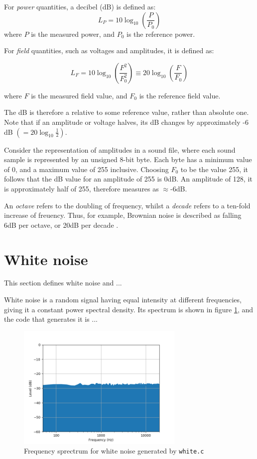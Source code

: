 \documentclass[a4paper,10pt]{article}
\def\code#1{\texttt{#1}}
\begin{document}
For \emph{power} quantities, a decibel (dB) is defined \cite{dB} as: 
\begin{equation}
 L_P = 10 \log_{10}\left(\frac{P}{P_0}\right)
\end{equation}
where $P$ is the measured power, and $P_0$ is the reference power.

For \emph{field} quantities, such as voltages and amplitudes, it is defined as:

\begin{equation}
 L_F = 10 \log_{10}\left(\frac{F^2}{F^2_0}\right) \equiv 20 \log_{10}\left(\frac{F}{F_0}\right)
\end{equation}

where $F$ is the measured field value, and $F_0$ is the reference field value.

The dB is therefore a relative to some reference value, rather than absolute one. Note that if an amplitude or voltage halves, its dB changes by approximately -6 dB $( = 20 \log_{10}\frac{1}{2})$.

Consider the representation of amplitudes in a sound file, where each sound sample is represented by an unsigned 8-bit byte. Each byte has a minimum value of 0, and a maximum value of 255 inclusive. Choosing $F_0$ to be the value 255, it follows that the dB value for an amplitude of 255 is 0dB. An amplitude of 128, it is approximately half of 255, therefore measures as $\approx$-6dB.

An \emph{octave} refers to the doubling of frequency, whilst a \emph{decade} refers to a ten-fold increase of freuency. Thus, for example, Brownian noise is described as falling 6dB per octave, or 20dB per decade \cite{brown}.


\section{White noise}
This section defines white noise and ...

White noise is a random signal having equal intensity at different frequencies, giving it a constant power spectral 
density\cite{wiki_white}. Its spectrum is shown in figure \ref{fig:wfs}, and the code that generates it is ...

\begin{figure}[h]
	\centering
	\includegraphics[height=6cm]{white.png}
	\caption{Frequency sprectrum for white noise generated by \code{white.c}}
	\label{fig:wfs}
\end{figure}
\end{document}
